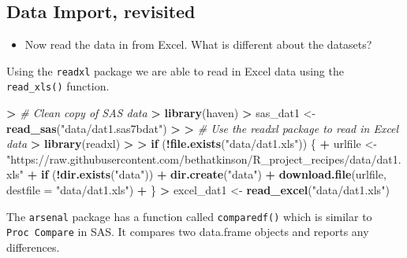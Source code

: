 \documentclass[
]{book}
\newenvironment{Shaded}{\begin{snugshade}}{\end{snugshade}}
\newcommand{\CommentTok}[1]{\textcolor[rgb]{0.56,0.35,0.01}{\textit{#1}}}
\newcommand{\ControlFlowTok}[1]{\textcolor[rgb]{0.13,0.29,0.53}{\textbf{#1}}}
\newcommand{\DataTypeTok}[1]{\textcolor[rgb]{0.13,0.29,0.53}{#1}}
\newcommand{\ErrorTok}[1]{\textcolor[rgb]{0.64,0.00,0.00}{\textbf{#1}}}
\newcommand{\KeywordTok}[1]{\textcolor[rgb]{0.13,0.29,0.53}{\textbf{#1}}}
\newcommand{\NormalTok}[1]{#1}
\newcommand{\OperatorTok}[1]{\textcolor[rgb]{0.81,0.36,0.00}{\textbf{#1}}}
\newcommand{\StringTok}[1]{\textcolor[rgb]{0.31,0.60,0.02}{#1}}
\providecommand{\tightlist}{%
  \setlength{\itemsep}{0pt}\setlength{\parskip}{0pt}}
\begin{document}
\hypertarget{data-import-revisited}{%
\subsection{Data Import, revisited}\label{data-import-revisited}}

\begin{itemize}
\tightlist
\item
  Now read the data in from Excel. What is different about the datasets?
\end{itemize}

Using the \texttt{readxl} package we are able to read in Excel data using the \texttt{read\_xls()} function.

\begin{Shaded}
\begin{Highlighting}[]
\OperatorTok{>}\StringTok{ }\CommentTok{# Clean copy of SAS data}
\ErrorTok{>}\StringTok{ }\KeywordTok{library}\NormalTok{(haven)}
\OperatorTok{>}\StringTok{ }\NormalTok{sas_dat1 <-}\StringTok{ }\KeywordTok{read_sas}\NormalTok{(}\StringTok{"data/dat1.sas7bdat"}\NormalTok{)}
\OperatorTok{>}\StringTok{ }
\ErrorTok{>}\StringTok{ }\CommentTok{# Use the readxl package to read in Excel data}
\ErrorTok{>}\StringTok{ }\KeywordTok{library}\NormalTok{(readxl)}
\OperatorTok{>}\StringTok{ }
\ErrorTok{>}\StringTok{ }\ControlFlowTok{if}\NormalTok{ (}\OperatorTok{!}\KeywordTok{file.exists}\NormalTok{(}\StringTok{"data/dat1.xls"}\NormalTok{)) \{}
\OperatorTok{+}\StringTok{     }\NormalTok{urlfile <-}\StringTok{ "https://raw.githubusercontent.com/bethatkinson/R_project_recipes/data/dat1.xls"}
\OperatorTok{+}\StringTok{     }\ControlFlowTok{if}\NormalTok{ (}\OperatorTok{!}\KeywordTok{dir.exists}\NormalTok{(}\StringTok{"data"}\NormalTok{)) }
\OperatorTok{+}\StringTok{         }\KeywordTok{dir.create}\NormalTok{(}\StringTok{"data"}\NormalTok{)}
\OperatorTok{+}\StringTok{     }\KeywordTok{download.file}\NormalTok{(urlfile, }\DataTypeTok{destfile =} \StringTok{"data/dat1.xls"}\NormalTok{)}
\OperatorTok{+}\StringTok{ }\NormalTok{\}}
\OperatorTok{>}\StringTok{ }\NormalTok{excel_dat1 <-}\StringTok{ }\KeywordTok{read_excel}\NormalTok{(}\StringTok{"data/dat1.xls"}\NormalTok{)}
\end{Highlighting}
\end{Shaded}

The \texttt{arsenal} package has a function called \texttt{comparedf()} which is similar to \texttt{Proc\ Compare} in SAS. It compares two data.frame objects and reports any differences.
\end{document}
